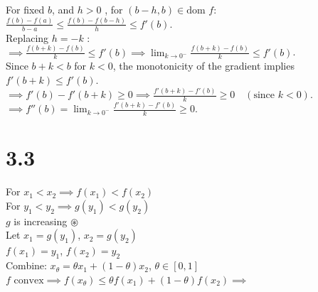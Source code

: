 \documentclass{article}
\begin{document}
\noindent For fixed $b$, and $h > 0$ ,  for $(b-h, b) \in \text{dom } f$: \\ \noindent  $\frac{f(b) - f(a)}{b - a} \leq \frac{f(b) - f(b-h)}{h} \leq f'(b)$. \\ \noindent Replacing $h = -k$ : \\ \noindent $\implies \frac{f(b+k) - f(b)}{k} \leq f'(b) \implies \lim_{k \to 0^-} \frac{f(b+k) - f(b)}{k} \leq f'(b)$. \\ \noindent Since $b+k < b$ for $k < 0$, the monotonicity of the gradient implies $f'(b+k) \leq f'(b)$. \\ \noindent $\implies f'(b) - f'(b+k) \geq 0 \implies \frac{f'(b+k) - f'(b)}{k} \geq 0 \quad (\text{since } k < 0)$. \\ \noindent $\implies f''(b) = \lim_{k \to 0^-} \frac{f'(b+k) - f'(b)}{k} \geq 0$.

































\newpage
\section*{3.3}
\noindent For $x_1 < x_2 \implies f(x_1) < f(x_2)$ \\
For $y_1 < y_2 \implies g(y_1) < g(y_2)$ \\
\hspace*{2cm} $g$ is increasing \quad $\circledast$ \\

\noindent Let $x_1 = g(y_1)$, $x_2 = g(y_2)$ \\
\hspace*{0.5cm} $f(x_1) = y_1$, $f(x_2) = y_2$ \\

\noindent Combine: $x_\theta = \theta x_1 + (1-\theta) x_2$, \quad $\theta \in [0, 1]$ \\

\noindent $f \text{ convex} \implies f(x_\theta) \leq \theta f(x_1) + (1-\theta) f(x_2) \implies$ \\
\end{document}
